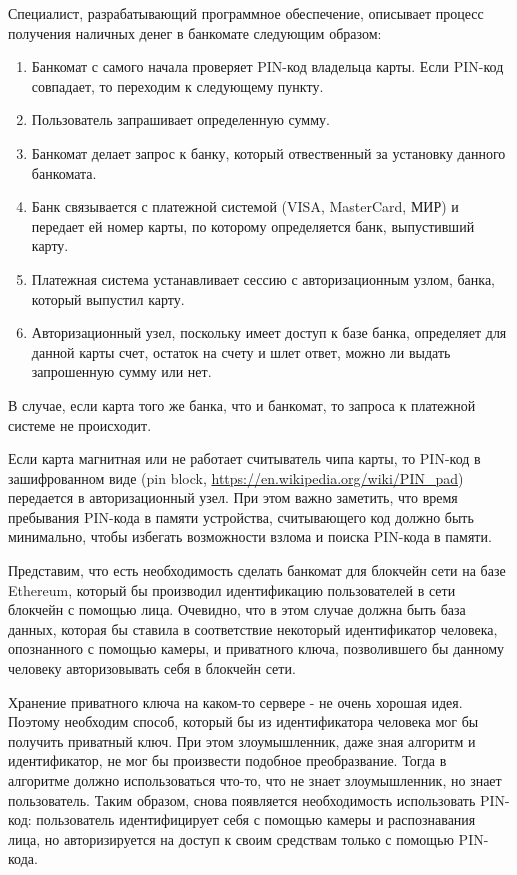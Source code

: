 
Специалист, разрабатывающий программное обеспечение, описывает процесс получения наличных денег в банкомате следующим образом:
\begin{enumerate}
  \item Банкомат с самого начала проверяет PIN-код владельца карты. Если PIN-код совпадает, то переходим к следующему пункту.
  \item Пользователь запрашивает определенную сумму.
  \item Банкомат делает запрос к банку, который отвественный за установку данного банкомата.
  \item Банк связывается с платежной системой (VISA, MasterCard, МИР) и передает ей номер карты, по которому определяется банк, выпустивший карту.
  \item Платежная система устанавливает сессию с авторизационным узлом, банка, который выпустил карту.
  \item Авторизационный узел, поскольку имеет доступ к базе банка, определяет для данной карты счет, остаток на счету и шлет ответ, можно ли выдать запрошенную сумму или нет.
\end{enumerate}

В случае, если карта того же банка, что и банкомат, то запроса к платежной системе не происходит.

Если карта магнитная или не работает считыватель чипа карты, то PIN-код в зашифрованном виде (pin block, \url{https://en.wikipedia.org/wiki/PIN_pad}) передается в авторизационный узел. При этом важно заметить, что время пребывания PIN-кода в памяти устройства, считывающего код должно быть минимально, чтобы избегать возможности взлома и поиска PIN-кода в памяти. 

Представим, что есть необходимость сделать банкомат для блокчейн сети на базе Ethereum, который бы производил идентификацию пользователей в сети блокчейн с помощью лица. Очевидно, что в этом случае должна быть база данных, которая бы ставила в соответствие некоторый идентификатор человека, опознанного с помощью камеры, и приватного ключа, позволившего бы данному человеку авторизовывать себя в блокчейн сети.

Хранение приватного ключа на каком-то сервере - не очень хорошая идея. Поэтому необходим способ, который бы из идентификатора человека мог бы получить приватный ключ. При этом злоумышленник, даже зная алгоритм и идентификатор, не мог бы произвести подобное преобразвание. Тогда в алгоритме должно использоваться что-то, что не знает злоумышленник, но знает пользователь. Таким образом, снова появляется необходимость использовать PIN-код: пользователь идентифицирует себя с помощью камеры и распознавания лица, но авторизируется на доступ к своим средствам только с помощью PIN-кода.

